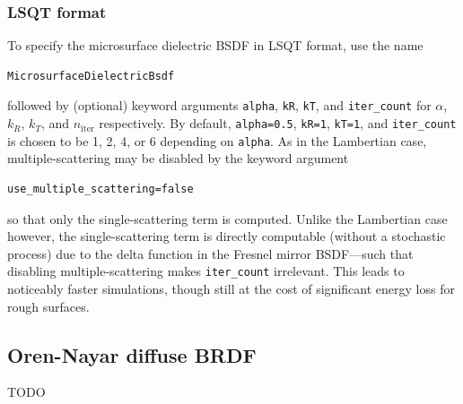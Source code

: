\documentclass[
    twoside,
    twocolumn,
    letterpaper,
    10pt]{article}
\begin{document}
\subsubsection{LSQT format}
To specify the microsurface dielectric BSDF in LSQT format, use the name
\begin{verbatim}
MicrosurfaceDielectricBsdf
\end{verbatim}
followed by (optional) keyword arguments \texttt{alpha}, \texttt{kR},
\texttt{kT}, and \texttt{iter\_count} for $\alpha$, $k_R$, $k_T$, and 
$n_{\text{iter}}$ respectively. By default, \texttt{alpha=0.5},
\texttt{kR=1}, \texttt{kT=1}, and \texttt{iter\_count} is chosen to 
be 1, 2, 4, or 6 depending on \texttt{alpha}. As in the Lambertian case,
multiple-scattering may be disabled by the keyword argument
\begin{verbatim}
use_multiple_scattering=false
\end{verbatim}
so that only the single-scattering term is computed. Unlike the
Lambertian case however, the single-scattering term is directly 
computable (without a stochastic process) due to the delta function 
in the Fresnel mirror BSDF---such that disabling multiple-scattering makes
\texttt{iter\_count} irrelevant. This leads to noticeably faster
simulations, though still at the cost of significant
energy loss for rough surfaces.

\subsection{Oren-Nayar diffuse BRDF}

TODO

{
\nocite{*}
\raggedright
\printbibliography
}
\end{document}
